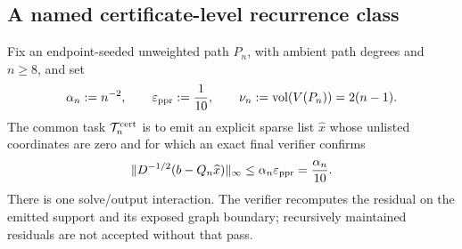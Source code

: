 \subsection{A named certificate-level recurrence class}

Fix an endpoint-seeded unweighted path $P_n$, with ambient path degrees and
$n\geq8$, and set
\begin{equation}
 \alpha_n:=n^{-2},
 \qquad \varepsilon_{\mathrm{ppr}}:=\frac1{10},
 \qquad \nu_n:=\operatorname{vol}(V(P_n))=2(n-1).
 \label{eq:certificate-path-task-parameters}
\end{equation}
The common task $\mathcal T_n^{\rm cert}$ is to emit an explicit sparse list
$\widehat x$ whose unlisted coordinates are zero and for which an exact final
verifier confirms
\begin{equation}
 \lVert D^{-1/2}(b-Q_n\widehat x)\rVert_\infty
 \leq \alpha_n\varepsilon_{\mathrm{ppr}}=\frac{\alpha_n}{10}.
 \label{eq:sparse-path-residual-task}
\end{equation}
There is one solve/output interaction.  The verifier recomputes the residual
on the emitted support and its exposed graph boundary; recursively maintained
residuals are not accepted without that pass.

